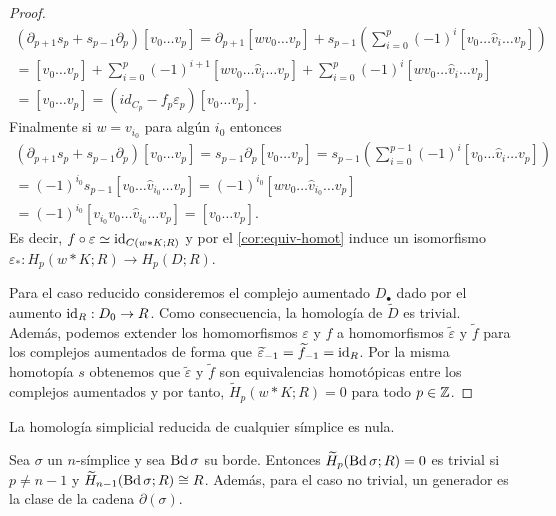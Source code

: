 \begin{proof}
\begin{gather*}
		(\partial_{p+1}s_{p}+ s_{p-1}\partial_{p})[v_{0}\ldots v_{p}] =\partial_{p+1}
		[wv_{0}\ldots v_{p}]+s_{p-1}\left(\sum_{i=0}^{p}(-1)^{i}[v_{0}\ldots\hat{v}_{i}
		\ldots v_{p}]\right) \\ =[v_{0}\ldots v_{p}]+\sum_{i=0}^{p}(-1)^{i+1}[wv_{0}\ldots
		\hat{v}_{i}\ldots v_{p}]+\sum_{i=0}^{p}(-1)^{i}[wv_{0}\ldots\hat{v}_{i}\ldots
		v_{p}] \\ =[v_{0}\ldots v_{p}]=(id_{C_{p}}-f_{p}\varepsilon_{p})[v_{0}\ldots
		v_{p}].
	\end{gather*}
	Finalmente si $w = v_{i_0}$ para algún $i_{0}$ entonces
	\begin{gather*}
		(\partial_{p+1}s_{p}+s_{p-1}\partial_{p})[v_{0}\ldots v_{p}]=s_{p-1}\partial_{p}
		[v_{0}\ldots v_{p}] =s_{p-1}\left( \sum_{i=0}^{p-1}(-1)^{i}[v_{0}\ldots \hat{v}
		_{i}\ldots v_{p}] \right) \\ =(-1)^{i_0}s_{p-1}[v_{0}\ldots \hat{v}_{i_0}\ldots
		v_{p}] =(-1)^{i_0}[wv_{0}\ldots \hat{v}_{i_0}\ldots v_{p}] \\ =(-1)^{i_0}[v_{i_0}
		v_{0}\ldots \hat{v}_{i_0}\ldots v_{p}] =[v_{0}\ldots v_{p}].
	\end{gather*}
	Es decir, $f \circ \varepsilon \simeq \operatorname{id}_{C(w \ast K;R)}$ y por el
	\autoref{cor:equiv-homot} induce un isomorfismo
	$\varepsilon_{*}: H_{p}(w \ast K;R) \to H_{p}(D;R)$.
	
	Para el caso reducido consideremos el complejo aumentado $D_{\bullet}$ dado
	por el aumento $\operatorname{id}_{R}: D_{0}\to R$. Como consecuencia, la homología de
	$\widetilde{D}$ es trivial. Además, podemos extender los homomorfismos
	$\varepsilon$ y $f$ a homomorfismos $\widetilde{\varepsilon}$ y
	$\widetilde{f}$ para los complejos aumentados de forma que
	$\widetilde{\varepsilon}_{-1}= \widetilde{f}_{-1}= \operatorname{id}_{R}$. Por la misma homotopía
	$s$ obtenemos que $\widetilde{\varepsilon}$ y $\widetilde{f}$ son equivalencias
	homotópicas entre los complejos aumentados y por tanto,
	$\widetilde{H}_{p}(w \ast K;R) = 0$ para todo $p \in \mathbb{Z}$.
\end{proof}
\begin{corolario}
	\label{cor:cono-nulo} La homología simplicial reducida de cualquier símplice es
	nula.
\end{corolario}
\begin{corolario}
	Sea $\sigma$ un $n$-símplice y sea $\operatorname{Bd} \sigma$ su borde. Entonces
	$\widetilde{H}_{p}(\operatorname{Bd} \sigma;R) = 0$ es trivial si $p \neq n-1$ y
	$\widetilde{H}_{n-1}(\operatorname{Bd} \sigma; R) \cong R$. Además, para el caso no trivial,
	un generador es la clase de la cadena $\partial(\sigma)$.
\end{corolario}
